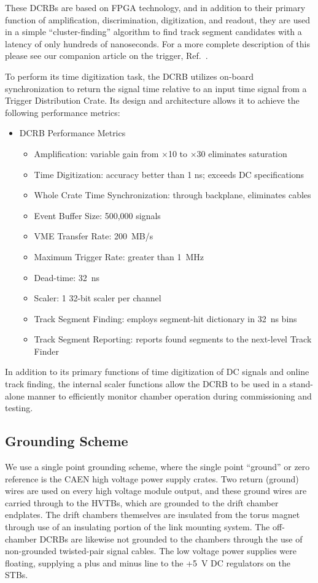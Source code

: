 These DCRBs are based on FPGA technology, and in addition to
their primary function of amplification, discrimination, digitization,
and readout, they are used in a simple ``cluster-finding'' algorithm
to find track segment candidates with a latency of only hundreds
of nanoseconds.  For a more complete description of this please
see our companion article on the trigger, Ref.~\cite{trigger-nim}.

To perform its time digitization task, the DCRB utilizes on-board synchronization to
return the signal time relative to an input time signal from  a Trigger Distribution
Crate. Its design and architecture
allows it to achieve the following performance metrics:
\begin{itemize}
\item DCRB Performance Metrics
\begin{itemize}
\item Amplification: variable gain from $\times$10 to $\times$30 eliminates saturation
\item Time Digitization: accuracy better than 1 ns; exceeds DC specifications
\item Whole Crate Time Synchronization: through backplane, eliminates cables
\item Event Buffer Size: 500,000 signals
\item VME Transfer Rate: 200~MB/s
\item Maximum Trigger Rate: greater than 1~MHz
\item Dead-time: 32~ns
\item Scaler: 1 32-bit scaler per channel
\item Track Segment Finding: employs segment-hit dictionary in 32~ns bins
\item Track Segment Reporting: reports found segments to the next-level Track Finder
\end{itemize}
\end{itemize}

In addition to its primary functions of time digitization of DC signals and online
track finding, the internal scaler functions allow the DCRB to be used in 
a stand-alone manner to efficiently monitor chamber operation during commissioning
and testing.

\subsection{Grounding Scheme}

We use a single point grounding scheme, where the single point ``ground'' or zero reference is 
the CAEN high voltage power supply crates.  Two return (ground) wires are used on every 
high voltage module output, and these ground wires are carried through to the HVTBs, which are 
grounded to the drift chamber endplates.  The drift chambers themselves are insulated from the 
torus magnet through use of an insulating portion of the link mounting system. The off-chamber DCRBs 
are likewise not grounded to the chambers through the use of non-grounded twisted-pair 
signal cables. The low voltage power supplies were floating, supplying a plus and minus line to the 
+5~V DC regulators on the STBs. 
